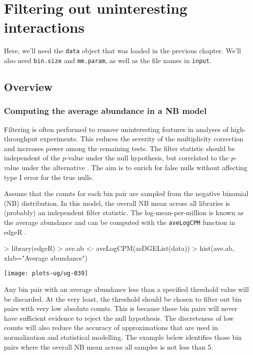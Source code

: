 \documentclass[12pt]{report}
\renewenvironment{Schunk}{\vspace{0pt}}{\vspace{0pt}}
\newcommand{\edgeR}{edgeR}
\newcommand{\code}[1]{{\small\texttt{#1}}}
\newenvironment{combox}
{ \begin{shaded}\begin{center}\begin{minipage}[t]{0.95\textwidth} }
{ \end{minipage}\end{center}\end{shaded} }
\begin{document}
\chapter{Filtering out uninteresting interactions}
\label{chap:filter}

\begin{combox}
Here, we'll need the \code{data} object that was loaded in the previous chapter.
We'll also need \code{bin.size} and \code{mm.param}, as well as the file names in \code{input}.
\end{combox}

\section{Overview}

\subsection{Computing the average abundance in a NB model}
Filtering is often performed to remove uninteresting features in analyses of high-throughput experiments. 
This reduces the severity of the multiplicity correction and increases power among the remaining tests. 
The filter statistic should be independent of the $p$-value under the null hypothesis, but correlated to the $p$-value under the alternative \citep{bourgon2010independent}. 
The aim is to enrich for false nulls without affecting type I error for the true nulls.

Assume that the counts for each bin pair are sampled from the negative binomial (NB) distribution.
In this model, the overall NB mean across all libraries is (probably) an independent filter statistic.
The log-mean-per-million is known as the average abundance and can be computed with the \code{aveLogCPM} function in \edgeR{} \citep{mccarthy2012glm}.

\begin{Schunk}
\begin{Sinput}
> library(edgeR)
> ave.ab <- aveLogCPM(asDGEList(data))
> hist(ave.ab, xlab="Average abundance")
\end{Sinput}
\end{Schunk}

\begin{center}
\texttt{[image: plots-ug/ug-039]}
\end{center}

Any bin pair with an average abundance less than a specified threshold value will be discarded.
At the very least, the threshold should be chosen to filter out bin pairs with very low absolute counts.
This is because these bin pairs will never have sufficient evidence to reject the null hypothesis.
The discreteness of low counts will also reduce the accuracy of approximations that are used in normalization and statistical modelling.
The example below identifies those bin pairs where the overall NB mean across all samples is not less than 5.
\end{document}
